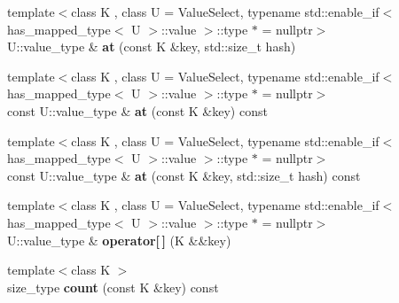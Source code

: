 \begin{DoxyCompactItemize}
\item 
\mbox{\label{classtsl_1_1detail__ordered__hash_1_1ordered__hash_a6fa86865eff7674628279e9278a3720e}} 
{\footnotesize template$<$class K , class U  = Value\+Select, typename std\+::enable\+\_\+if$<$ has\+\_\+mapped\+\_\+type$<$ U $>$\+::value $>$\+::type $\ast$  = nullptr$>$ }\\U\+::value\+\_\+type \& {\bfseries at} (const K \&key, std\+::size\+\_\+t hash)
\item 
\mbox{\label{classtsl_1_1detail__ordered__hash_1_1ordered__hash_ab724b5e7810ceb1ace5fd1b9a2e2b6c3}} 
{\footnotesize template$<$class K , class U  = Value\+Select, typename std\+::enable\+\_\+if$<$ has\+\_\+mapped\+\_\+type$<$ U $>$\+::value $>$\+::type $\ast$  = nullptr$>$ }\\const U\+::value\+\_\+type \& {\bfseries at} (const K \&key) const
\item 
\mbox{\label{classtsl_1_1detail__ordered__hash_1_1ordered__hash_a043c2dcd264ffd1f1ae8c96193e16d96}} 
{\footnotesize template$<$class K , class U  = Value\+Select, typename std\+::enable\+\_\+if$<$ has\+\_\+mapped\+\_\+type$<$ U $>$\+::value $>$\+::type $\ast$  = nullptr$>$ }\\const U\+::value\+\_\+type \& {\bfseries at} (const K \&key, std\+::size\+\_\+t hash) const
\item 
\mbox{\label{classtsl_1_1detail__ordered__hash_1_1ordered__hash_a0c013a0d6f215174ea0bf269d68bad4e}} 
{\footnotesize template$<$class K , class U  = Value\+Select, typename std\+::enable\+\_\+if$<$ has\+\_\+mapped\+\_\+type$<$ U $>$\+::value $>$\+::type $\ast$  = nullptr$>$ }\\U\+::value\+\_\+type \& {\bfseries operator\mbox{[}$\,$\mbox{]}} (K \&\&key)
\item 
\mbox{\label{classtsl_1_1detail__ordered__hash_1_1ordered__hash_a7e6124da7c9ae05f5f6897b80d4cf8dc}} 
{\footnotesize template$<$class K $>$ }\\size\+\_\+type {\bfseries count} (const K \&key) const
\item 
\mbox{\label{classtsl_1_1detail__ordered__hash_1_1ordered__hash_af4848aba22f0271c8dd0c9e1356174a4}} 

\end{DoxyCompactItemize}
